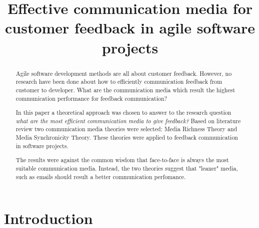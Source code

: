 \documentclass[conference]{IEEEtran}
\begin{document}
%
\title{Effective communication media for customer feedback in agile software projects}

\author{
}

\maketitle


\begin{abstract}

Agile software development methods are all about customer feedback. However, no research have been done about how to efficiently communication feedback from customer to developer. What are the communication media which result the highest communication performance for feedback communication?

In this paper a theoretical approach was chosen to answer to the research question \textit{what are the most efficient communication media to give feedback?} Based on literature review two communication media theories were selected: Media Richness Theory and Media Synchronicity Theory. These theories were applied to feedback communication in software projects.

The results were against the common wisdom that face-to-face is always the most suitable communication media. Instead, the two theories suggest that "leaner" media, such as emails should result a better communication perfomance. 

\end{abstract}

\IEEEpeerreviewmaketitle



\section{Introduction}
\end{document}
